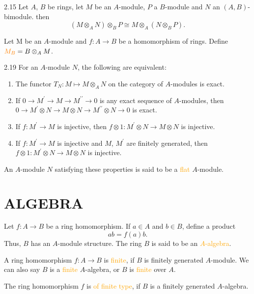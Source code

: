 \begin{proposition}{2.15}
	Let $A$, $B$ be rings, let $M$ be an $A$-module, $P$ a $B$-module and $N$ an $(A,B)$-bimodule. then
	\begin{equation*}
		\left(M\otimes_AN\right)\otimes_BP\cong M\otimes_A\left(N\otimes_BP\right).
	\end{equation*}
\end{proposition}

Let M be an $A$-module and $f: A\rightarrow B$ be a homomorphism of rings. Define $\mathcolor{orange}{M_B}=B\otimes_AM$.

\begin{proposition}{2.19}
	For an $A$-module $N$, the following are equivalent:
	\begin{enumerate}[label=\textup{(\roman*)},ref=\thepropositiontemp(\roman*)]
		\item The functor $T_N:M\mapsto M\otimes_AN$ on the category of $A$-modules is exact.
		\item If $0\rightarrow M^\prime\rightarrow M\rightarrow M^{\prime\prime}\rightarrow0$ is any exact sequence of $A$-modules, then $0\rightarrow M^\prime\otimes N\rightarrow M\otimes N\rightarrow M^{\prime\prime}\otimes N\rightarrow0$ is exact.
		\item If $f:M^\prime\rightarrow M$ is injective, then $f\otimes1:M^\prime\otimes N\rightarrow M\otimes N$ is injective.
		\item\label{2.19.4} If $f:M^\prime\rightarrow M$ is injective and $M$, $M^\prime$ are finitely generated, then $f\otimes1:M^\prime\otimes N\rightarrow M\otimes N$ is injective.
	\end{enumerate}
	
	An $A$-module $N$ satisfying these properties is said to be a \textcolor{orange}{flat} $A$-module.
\end{proposition}

\section*{ALGEBRA}

Let $f:A\rightarrow B$ be a ring homomorphism. If $a\in A$ and $b\in B$, define a product
\begin{equation*}
	ab=f(a)b.
\end{equation*}
Thus, $B$ has an $A$-module structure. The ring $B$ is said to be an \textcolor{orange}{$A$-algebra}.

\begin{definition}
	A ring homomorphism $f:A\rightarrow B$ is \textcolor{orange}{finite}, if $B$ is finitely generated $A$-module. We can also say $B$ is a \textcolor{orange}{finite} $A$-algebra, or $B$ is \textcolor{orange}{finite} over $A$.
	
	The ring homomorphism $f$ is \textcolor{orange}{of finite type}, if $B$ is a finitely generated $A$-algebra. 
\end{definition}
